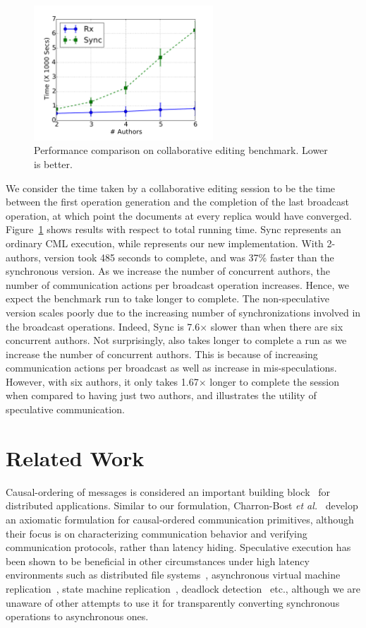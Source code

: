 \begin{figure}[t]
\centering
\includegraphics[width=0.6\textwidth]{Graphs/collab}
\caption{Performance comparison on collaborative editing benchmark. Lower is
better.}
\label{grf:collab}
\end{figure}

We consider the time taken by a collaborative editing session to be the time
between the first operation generation and the completion of the last broadcast
operation, at which point the documents at every replica would have converged.
Figure~\ref{grf:collab} shows results with respect to total running time. Sync
represents an ordinary CML execution, while \rxcml represents our new
implementation. With 2-authors, \rxcml version took 485 seconds to complete,
and was 37\% faster than the synchronous version. As we increase the number of
concurrent authors, the number of communication actions per broadcast operation
increases.  Hence, we expect the benchmark run to take longer to complete. The
non-speculative version scales poorly due to the increasing number of
synchronizations involved in the broadcast operations. Indeed, Sync is
7.6$\times$ slower than \rxcml when there are six concurrent authors. Not
surprisingly, \rxcml also takes longer to complete a run as we increase the
number of concurrent authors. This is because of increasing communication
actions per broadcast as well as increase in mis-speculations. However, with
six authors, it only takes 1.67$\times$ longer to complete the session when
compared to having just two authors, and illustrates the utility of speculative
communication.

\section{Related Work}

Causal-ordering of messages is considered an important building
block~\cite{Birman87} for distributed applications. Similar to our formulation,
Charron-Bost \emph{et al.}~\cite{Charron-Bost96} develop an axiomatic
formulation for causal-ordered communication primitives, although their focus
is on characterizing communication behavior and verifying communication
protocols, rather than latency hiding. Speculative execution has been shown to
be beneficial in other circumstances under high latency environments such as
distributed file systems~\cite{Nightingale05}, asynchronous virtual machine
replication~\cite{Cully08}, state machine replication~\cite{Wester09}, deadlock
detection~\cite{Li05} etc., although we are unaware of other attempts to use it
for transparently converting synchronous operations to asynchronous ones.

